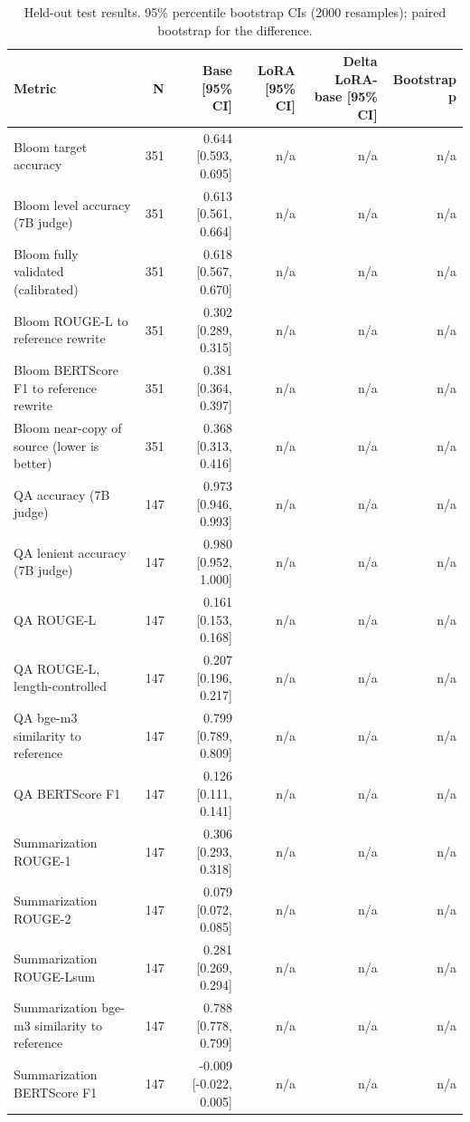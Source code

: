 \begin{table}[t]
\centering
\caption{Held-out test results. 95\% percentile bootstrap CIs (2000 resamples); paired bootstrap for the difference.}
\label{tab:t3_main_results}
\begin{tabular}{lrrrrr}
\toprule
Metric & N & Base [95\% CI] & LoRA [95\% CI] & Delta LoRA-base [95\% CI] & Bootstrap p \\
\midrule
Bloom target accuracy & 351 & 0.644 [0.593, 0.695] & n/a & n/a & n/a \\
Bloom level accuracy (7B judge) & 351 & 0.613 [0.561, 0.664] & n/a & n/a & n/a \\
Bloom fully validated (calibrated) & 351 & 0.618 [0.567, 0.670] & n/a & n/a & n/a \\
Bloom ROUGE-L to reference rewrite & 351 & 0.302 [0.289, 0.315] & n/a & n/a & n/a \\
Bloom BERTScore F1 to reference rewrite & 351 & 0.381 [0.364, 0.397] & n/a & n/a & n/a \\
Bloom near-copy of source (lower is better) & 351 & 0.368 [0.313, 0.416] & n/a & n/a & n/a \\
QA accuracy (7B judge) & 147 & 0.973 [0.946, 0.993] & n/a & n/a & n/a \\
QA lenient accuracy (7B judge) & 147 & 0.980 [0.952, 1.000] & n/a & n/a & n/a \\
QA ROUGE-L & 147 & 0.161 [0.153, 0.168] & n/a & n/a & n/a \\
QA ROUGE-L, length-controlled & 147 & 0.207 [0.196, 0.217] & n/a & n/a & n/a \\
QA bge-m3 similarity to reference & 147 & 0.799 [0.789, 0.809] & n/a & n/a & n/a \\
QA BERTScore F1 & 147 & 0.126 [0.111, 0.141] & n/a & n/a & n/a \\
Summarization ROUGE-1 & 147 & 0.306 [0.293, 0.318] & n/a & n/a & n/a \\
Summarization ROUGE-2 & 147 & 0.079 [0.072, 0.085] & n/a & n/a & n/a \\
Summarization ROUGE-Lsum & 147 & 0.281 [0.269, 0.294] & n/a & n/a & n/a \\
Summarization bge-m3 similarity to reference & 147 & 0.788 [0.778, 0.799] & n/a & n/a & n/a \\
Summarization BERTScore F1 & 147 & -0.009 [-0.022, 0.005] & n/a & n/a & n/a \\
\bottomrule
\end{tabular}
\end{table}
